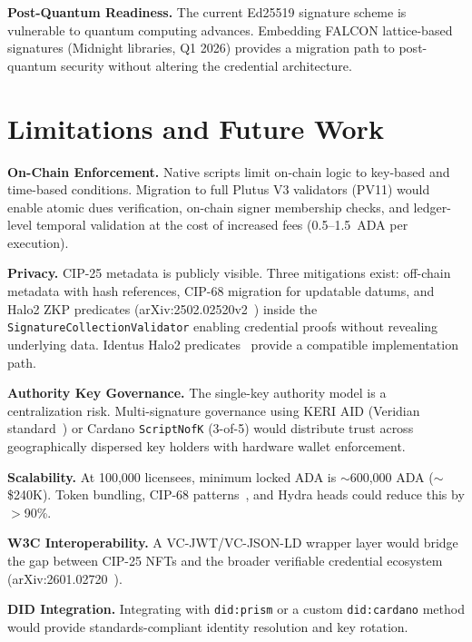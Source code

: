 \documentclass[conference,10pt]{IEEEtran}
\begin{document}
\textbf{Post-Quantum Readiness.} The current Ed25519 signature scheme is vulnerable to quantum computing advances. Embedding FALCON lattice-based signatures (Midnight libraries, Q1 2026) provides a migration path to post-quantum security without altering the credential architecture.

\section{Limitations and Future Work}
\label{sec:limitations}

\textbf{On-Chain Enforcement.} Native scripts limit on-chain logic to key-based and time-based conditions. Migration to full Plutus V3 validators (PV11) would enable atomic dues verification, on-chain signer membership checks, and ledger-level temporal validation at the cost of increased fees (0.5--1.5~ADA per execution).

\textbf{Privacy.} CIP-25 metadata is publicly visible. Three mitigations exist: off-chain metadata with hash references, CIP-68 migration for updatable datums, and Halo2 ZKP predicates (arXiv:2502.02520v2~\cite{halo2zkp}) inside the \texttt{SignatureCollectionValidator} enabling credential proofs without revealing underlying data. Identus Halo2 predicates~\cite{identus2025} provide a compatible implementation path.

\textbf{Authority Key Governance.} The single-key authority model is a centralization risk. Multi-signature governance using KERI AID (Veridian standard~\cite{veridian2025}) or Cardano \texttt{ScriptNofK} (3-of-5) would distribute trust across geographically dispersed key holders with hardware wallet enforcement.

\textbf{Scalability.} At 100,000 licensees, minimum locked ADA is ${\sim}$600,000 ADA (${\sim}$\$240K). Token bundling, CIP-68 patterns~\cite{cip68}, and Hydra heads could reduce this by $>$90\%.

\textbf{W3C Interoperability.} A VC-JWT/VC-JSON-LD wrapper layer would bridge the gap between CIP-25 NFTs and the broader verifiable credential ecosystem (arXiv:2601.02720~\cite{lerbridge}).

\textbf{DID Integration.} Integrating with \texttt{did:prism} or a custom \texttt{did:cardano} method would provide standards-compliant identity resolution and key rotation.
\end{document}
